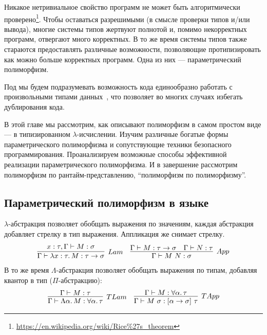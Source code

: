 
Никакое нетривиальное свойство программ не может быть алгоритмически проверено\footnote{\url{https://en.wikipedia.org/wiki/Rice\%27s_theorem}}.
Чтобы оставаться разрешимыми (в смысле проверки типов и/или вывода), многие системы типов жертвуют полнотой и, помимо некорректных программ, отвергают много корректных.
В то же время системы типов также стараются предоставлять различные возможности, позволяющие протипизировать как можно больше корректных программ.
Одна из них --- параметрический полиморфизм.

Под  мы будем подразумевать возможность кода единообразно работать с произвольными типами данных~\cite{strachey2000fundamental, cardelli1985understanding}, что позволяет во многих случаях избегать дублирования кода.

В этой главе мы рассмотрим, как описывают полиморфизм в самом простом виде --- в типизированном $\lambda$-исчислении.
Изучим различные богатые формы параметрического полиморфизма и сопутствующие техники безопасного программирования.
Проанализируем возможные способы эффективной реализации параметрического полиморфизма.
И в завершение рассмотрим полиморфизм по рантайм-представлению, ``полиморфизм по полиморфизму''.

\subsection{Параметрический полиморфизм в языке} \label{subsec:lang-parametric-polumorphism}

$\lambda$-абстракция позволяет обобщать выражения по значениям, каждая абстракция добавляет стрелку в тип выражения.
Аппликация же снимает стрелку.
\[
    \begin{array}{cc}
        \infer[Lam]{\Gamma\vdash \lambda x : \tau\ldotp M : \tau\to\sigma}{x : \tau, \Gamma\vdash M : \sigma}
        &
        \infer[App]{\Gamma\vdash M\ap N : \sigma}{\Gamma\vdash M : \tau\to\sigma & \Gamma\vdash N : \tau}
    \end{array}
\]
В то же время $\Lambda$-абстракция позволяет обобщать выражения по типам, добавляя квантор в тип ($\Pi$-абстракцию):
\[
    \begin{array}{cc}
        \infer[TLam]{\Gamma\vdash\Lambda\alpha\ldotp M : \forall\alpha\ldotp\tau}{\Gamma\vdash M : \tau}
        &
        \infer[TApp]{\Gamma\vdash M\ap\sigma : [\alpha\to\sigma]\ap\tau}{\Gamma\vdash M : \forall\alpha\ldotp\tau}
    \end{array}
\]


